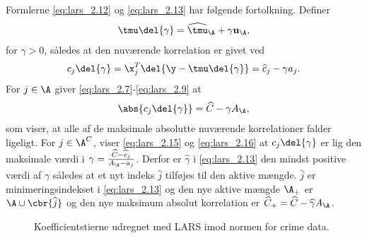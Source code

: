 %
Formlerne \eqref{eq:lars_2.12} og \eqref{eq:lars_2.13} har følgende fortolkning.
Definer
\begin{align}
\tmu \del{\gamma} = \widehat{\tmu}_\A + \gamma \mathbf{u}_\A, \label{eq:lars_2.14}
\end{align}
for \(\gamma > 0\), således at den nuværende korrelation er givet ved
\begin{align}
c_j \del{\gamma} = \x_j^T \del{\y - \tmu \del{\gamma}} = \widehat{c}_j - \gamma a_j. \label{eq:lars_2.15}
\end{align}
For \(j \in \A\) giver \eqref{eq:lars_2.7}-\eqref{eq:lars_2.9} at
\begin{align}
\abs{c_j \del{\gamma}} = \widehat{C} - \gamma A_\A,\label{eq:lars_2.16}
\end{align}
som viser, at alle af de maksimale absolutte nuværende korrelationer falder ligeligt.
For \(j \in \A^C\), viser \eqref{eq:lars_2.15} og \eqref{eq:lars_2.16} at \(c_j \del{\gamma}\) er lig den maksimale værdi i \(\gamma = \frac{\widehat{C} - \widehat{c}_j}{A_\A - a_j}\).
Derfor er \(\hat{\gamma}\) i \eqref{eq:lars_2.13} den mindst positive værdi af \(\gamma\) således at et nyt indeks \(\widehat{j}\) tilføjes til den aktive mængde.
\(\hat{j}\) er minimeringsindekset i \eqref{eq:lars_2.13} og den nye aktive mængde \(\A_+\) er \(\A \cup \cbr{\widehat{j}}\) og den nye maksimum absolut korrelation er \(\widehat{C}_+ = \widehat{C}- \widehat{\gamma} A_\A\).
%
\begin{figure}[H]
\centering
{}
\caption{Koefficientstierne udregnet med LARS imod normen for crime data.} \label{fig:crime_lar}
\end{figure}
